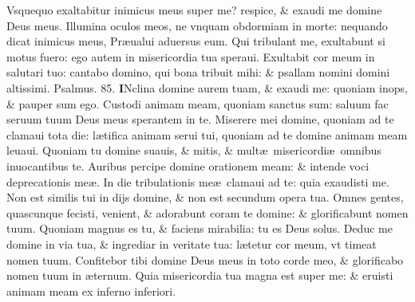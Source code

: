 \documentclass[a5paper,10pt]{book}
\def\ae{æ}
\begin{document}
\begin{multicols*}{2}
\newline \color{red} V\color{black}squequo exaltabitur inimicus meus super me? respice, \& exaudi me domine Deus meus.
\newline \color{red} I\color{black}llumina oculos meos, ne vnquam obdormiam in morte: nequando dicat inimicus meus, Pr\ae ualui aduersus eum.
\newline \color{red} Q\color{black}ui tribulant me, exultabunt si motus fuero: ego autem in misericordia tua speraui.
\newline \color{red} E\color{black}xultabit cor meum in salutari tuo: cantabo domino, qui bona tribuit mihi: \& psallam nomini domini altissimi.
\newline \color{red} Psalmus. 85. \color{black}
\vspace{-.5em}
\lettrine[lines=2]{\bfseries \color{red} I}{}Nclina domine aurem tuam, \& exaudi me: quoniam inops, \& pauper sum ego.
\newline \color{red} C\color{black}ustodi animam meam, quoniam sanctus sum: saluum fac seruum tuum Deus meus sperantem in te.
\newline \color{red} M\color{black}iserere mei domine, quoniam ad te clamaui tota die: l\ae tifica animam serui tui, quoniam ad te domine animam meam leuaui.
\newline \color{red} Q\color{black}uoniam tu domine suauis, \& mitis, \& mult\ae \ misericordi\ae \ omnibus inuocantibus te.
\newline \color{red} A\color{black}uribus percipe domine orationem meam: \& intende voci deprecationis me\ae .
\newline \color{red} I\color{black}n die tribulationis me\ae \ clamaui ad te: quia exaudisti me.
\newline \color{red} N\color{black}on est similis tui in dijs domine, \& non est secundum opera tua.
\newline \color{red} O\color{black}mnes gentes, quascunque fecisti, venient, \& adorabunt coram te domine: \& glorificabunt nomen tuum.
\newline \color{red} Q\color{black}uoniam magnus es tu, \& faciens mirabilia: tu es Deus solus.
\newline \color{red} D\color{black}educ me domine in via tua, \& ingrediar in veritate tua: l\ae tetur cor meum, vt timeat nomen tuum.
\newline \color{red} C\color{black}onfitebor tibi domine Deus meus in toto corde meo, \& glorificabo nomen tuum in \ae ternum.
\newline \color{red} Q\color{black}uia misericordia tua magna est super me: \& eruisti animam meam ex inferno inferiori.

\end{multicols*}
\end{document}
